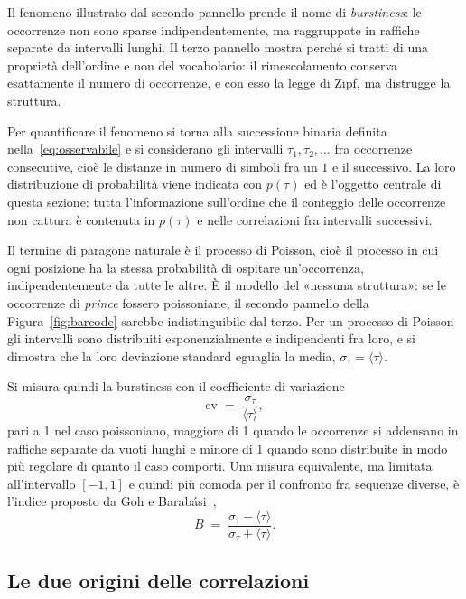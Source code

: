 Il fenomeno illustrato dal secondo pannello prende il nome di
\emph{burstiness}: le occorrenze non sono sparse indipendentemente, ma
raggruppate in raffiche separate da intervalli lunghi. Il terzo pannello mostra
perché si tratti di una proprietà dell'ordine e non del vocabolario: il
rimescolamento conserva esattamente il numero di occorrenze, e con esso la legge
di Zipf, ma distrugge la struttura.

Per quantificare il fenomeno si torna alla successione binaria definita
nella~\eqref{eq:osservabile} e si considerano gli intervalli
$\tau_1, \tau_2, \dots$ fra occorrenze consecutive, cioè le distanze in numero
di simboli fra un $1$ e il successivo. La loro distribuzione di probabilità
viene indicata con $p(\tau)$ ed è l'oggetto centrale di questa sezione: tutta
l'informazione sull'ordine che il conteggio delle occorrenze non cattura è
contenuta in $p(\tau)$ e nelle correlazioni fra intervalli successivi.

Il termine di paragone naturale è il processo di Poisson, cioè il processo in
cui ogni posizione ha la stessa probabilità di ospitare un'occorrenza,
indipendentemente da tutte le altre. È il modello del «nessuna struttura»: se le
occorrenze di \emph{prince} fossero poissoniane, il secondo pannello della
Figura~\ref{fig:barcode} sarebbe indistinguibile dal terzo. Per un processo di
Poisson gli intervalli sono distribuiti esponenzialmente e indipendenti fra
loro, e si dimostra che la loro deviazione standard eguaglia la media,
$\sigma_\tau = \langle\tau\rangle$.

Si misura quindi la burstiness con il coefficiente di variazione
\begin{equation}
  \mathrm{cv} \;=\; \frac{\sigma_\tau}{\langle\tau\rangle},
  \label{eq:cv}
\end{equation}
pari a 1 nel caso poissoniano, maggiore di 1 quando le occorrenze si addensano
in raffiche separate da vuoti lunghi e minore di 1 quando sono distribuite in
modo più regolare di quanto il caso comporti. Una misura equivalente, ma
limitata all'intervallo $[-1,1]$ e quindi più comoda per il confronto fra
sequenze diverse, è l'indice proposto da Goh e Barabási~\cite{goh2008},
\begin{equation}
  B \;=\; \frac{\sigma_\tau - \langle\tau\rangle}
                {\sigma_\tau + \langle\tau\rangle} .
  \label{eq:goh}
\end{equation}

\subsection{Le due origini delle correlazioni}
\label{sec:origini}

